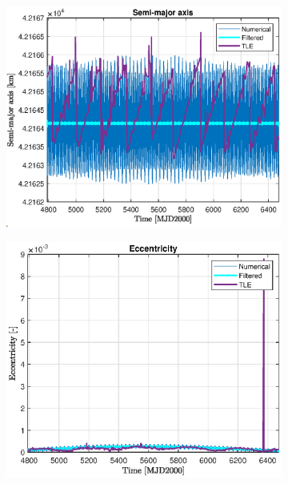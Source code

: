 \documentclass{article}
\begin{document}
\begin{figure}[H]
	\centering
	\begin{subfigure}[b]{0.45\textwidth}
		\includegraphics[width=\textwidth]{a_TLE.eps}
		\caption{}
		\label{fig:10a}
	\end{subfigure}%
    \hfill
	\begin{subfigure}[b]{0.45\textwidth}
		\includegraphics[width=\textwidth]{e_TLE.eps}
		\caption{}
		\label{fig:10b}
	\end{subfigure}%
	

\end{figure}
\end{document}
